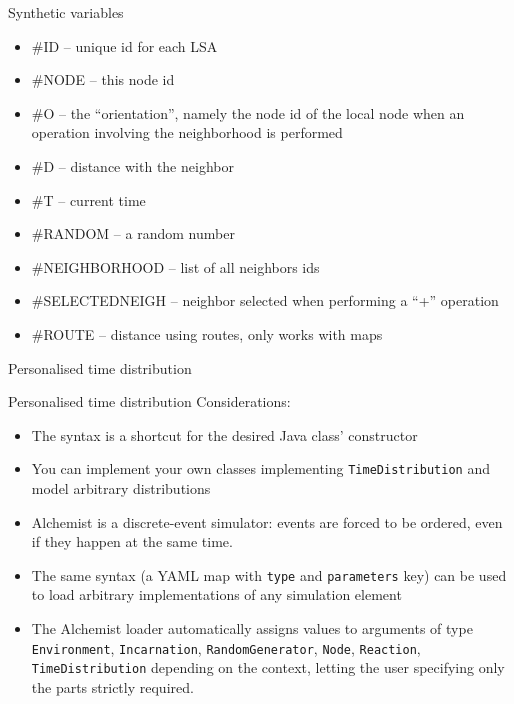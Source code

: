 \documentclass[presentation]{beamer}
\begin{document}
\begin{frame}[fragile]{Synthetic variables}
\begin{itemize}
 \item \#ID -- unique id for each LSA
 \item \#NODE -- this node id
 \item \#O -- the ``orientation'', namely the node id of the local node when an operation involving the neighborhood is performed
 \item \#D -- distance with the neighbor
 \item \#T -- current time
 \item \#RANDOM -- a random number
 \item \#NEIGHBORHOOD -- list of all neighbors ids
 \item \#SELECTEDNEIGH -- neighbor selected when performing a ``+'' operation
 \item \#ROUTE -- distance using routes, only works with maps
\end{itemize}
\end{frame}

\begin{frame}[fragile]{Personalised time distribution}
\end{frame}

\begin{frame}[fragile]{Personalised time distribution}
	Considerations:
	\begin{itemize}
		\item The syntax is a shortcut for the desired Java class' constructor
		\item You can implement your own classes implementing \texttt{TimeDistribution} and model arbitrary distributions
		\item Alchemist is a discrete-event simulator: events are forced to be ordered, even if they happen at the same time.
		\item The same syntax (a YAML map with \texttt{type} and \texttt{parameters} key) can be used to load arbitrary implementations of any simulation element
		\item The Alchemist loader automatically assigns values to arguments of type \texttt{Environment}, \texttt{Incarnation}, \texttt{RandomGenerator}, \texttt{Node}, \texttt{Reaction}, \texttt{TimeDistribution} depending on the context, letting the user specifying only the parts strictly required.
	\end{itemize}
\end{frame}
\end{document}
